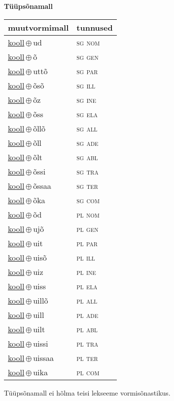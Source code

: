 

\vspace{3.5em}
\noindent \begin{minipage}{\textwidth}
\noindent \textbf{Tüüpsõnamall \,}\\

\begin{sideways}
\begin{tabular}{l l}
muutvormimall & tunnused \\
\hline
\underline{kooll}\,$\oplus$\,ud & \textsc{ sg nom } \\
\underline{kooll}\,$\oplus$\,õ & \textsc{ sg gen } \\
\underline{kooll}\,$\oplus$\,uttõ & \textsc{ sg par } \\
\underline{kooll}\,$\oplus$\,õsõ & \textsc{ sg ill } \\
\underline{kooll}\,$\oplus$\,õz & \textsc{ sg ine } \\
\underline{kooll}\,$\oplus$\,õss & \textsc{ sg ela } \\
\underline{kooll}\,$\oplus$\,õllõ & \textsc{ sg all } \\
\underline{kooll}\,$\oplus$\,õll & \textsc{ sg ade } \\
\underline{kooll}\,$\oplus$\,õlt & \textsc{ sg abl } \\
\underline{kooll}\,$\oplus$\,õssi & \textsc{ sg tra } \\
\underline{kooll}\,$\oplus$\,õssaa & \textsc{ sg ter } \\
\underline{kooll}\,$\oplus$\,õka & \textsc{ sg com } \\
\underline{kooll}\,$\oplus$\,õd & \textsc{ pl nom } \\
\underline{kooll}\,$\oplus$\,ujõ & \textsc{ pl gen } \\
\underline{kooll}\,$\oplus$\,uit & \textsc{ pl par } \\
\underline{kooll}\,$\oplus$\,uisõ & \textsc{ pl ill } \\
\underline{kooll}\,$\oplus$\,uiz & \textsc{ pl ine } \\
\underline{kooll}\,$\oplus$\,uiss & \textsc{ pl ela } \\
\underline{kooll}\,$\oplus$\,uillõ & \textsc{ pl all } \\
\underline{kooll}\,$\oplus$\,uill & \textsc{ pl ade } \\
\underline{kooll}\,$\oplus$\,uilt & \textsc{ pl abl } \\
\underline{kooll}\,$\oplus$\,uissi & \textsc{ pl tra } \\
\underline{kooll}\,$\oplus$\,uissaa & \textsc{ pl ter } \\
\underline{kooll}\,$\oplus$\,uika & \textsc{ pl com } \\
\end{tabular}
\end{sideways}
\label{tab:tüüpsõnamall-koollud}

\end{minipage}

 
\vspace{1em}
\noindent Tüüpsõnamall  ei hõlma teisi lekseeme vormi\-sõnastikus.
